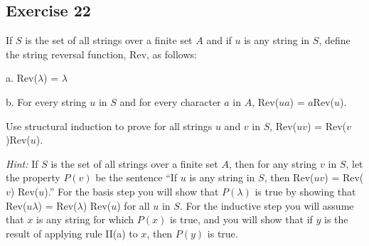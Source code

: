 \documentclass[14pt]{extarticle}
\begin{document}
\subsection{Exercise 22}
If $S$ is the set of all strings over a finite set $A$ and if $u$ is any string in $S$, define the string reversal function, Rev, as follows:

a. Rev($\lambda$) = $\lambda$

b. For every string $u$ in $S$ and for every character $a$ in $A$, Rev($ua$) = $a$Rev($u$).

Use structural induction to prove for all strings $u$ and $v$ in $S$, Rev($uv$) = Rev($v$)Rev($u$).

{\it Hint:} If $S$ is the set of all strings over a finite set $A$, then for any string $v$ in $S$, let the property 
$P(v)$ be the sentence “If $u$ is any string in $S$, then Rev($uv$) = Rev($v$) Rev($u$).” For the basis step you 
will show that $P(\lambda)$ is true by showing that Rev($u \lambda$) = Rev($\lambda$) Rev($u$) for all $u$ in $S$. For 
the inductive step you will assume that $x$ is any string for which $P(x)$ is true, and you will show that if $y$ is 
the result of applying rule II(a) to $x$, then $P(y)$ is true.
\end{document}
